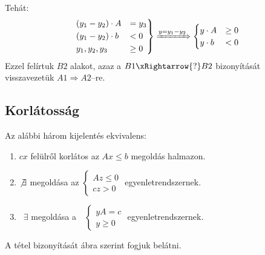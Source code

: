 Tehát:
\[
\begin{rcases}
(y_1 - y_2) \cdot A &= y_3 \\ 
(y_1 - y_2) \cdot b &< 0 \\
y_1, y_2, y_3 &\geq 0
\end{rcases} \xRightarrow{y=y_1-y_2} 
\begin{cases}
y \cdot A &\geq 0 \\ 
y \cdot b &< 0
\end{cases}
\]
Ezzel felírtuk $B2$ alakot, azaz a $B1\xRightarrow{?}B2$ bizonyítását
visszavezetük $A1 \Rightarrow A2$--re.

\subsection{Korlátosság}

Az alábbi három kijelentés ekvivalens:

\begin{enumerate}
  \item $cx$ felülről korlátos az $Ax \leq b$ megoldás halmazon.
  \item $\not \exists$ megoldása az $ \begin{cases}
  Az \leq 0 \\
  cz > 0
  \end{cases} $ egyenletrendszernek.
  \item ~$\exists$ megoldása a~~$\begin{cases}
  yA=c \\
  y \geq 0
  \end{cases}$ egyenletrendszernek.
\end{enumerate}

A tétel bizonyítását  ábra szerint fogjuk belátni.
 
